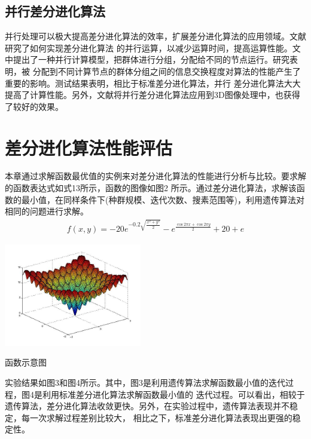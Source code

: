 \documentclass[a4paper,11pt,onecolumn,twoside]{article}
\makeatletter
\newenvironment{figurehere}
  {\def\@captype{figure}}
  {}
\makeatother
\begin{document}
\begin{CJK*}{GBK}{song}
\begin{multicols}{2}
\subsection{并行差分进化算法}
\indent 并行处理可以极大提高差分进化算法的效率，扩展差分进化算法的应用领域。文献\supercite{7}研究了如何实现差分进化算法
的并行运算，以减少运算时间，提高运算性能。文中提出了一种并行计算模型，把群体进行分组，分配给不同的节点运行。研究表明，被
分配到不同计算节点的群体分组之间的信息交换程度对算法的性能产生了重要的影响。测试结果表明，相比于标准差分进化算法，并行
差分进化算法大大提高了计算性能。另外，文献\supercite{8}将并行差分进化算法应用到3D图像处理中，也获得了较好的效果。

\section{差分进化算法性能评估}
\indent 本章通过求解函数最优值的实例来对差分进化算法的性能进行分析与比较。要求解的函数表达式如式13所示，函数的图像如图2
所示。通过差分进化算法，求解该函数的最小值，在同样条件下(种群规模、迭代次数、搜素范围等)，利用遗传算法对相同的问题进行求解。
	\begin{equation}
		\begin{split}
			f(x,y)=-20e^{-0.2\sqrt{\frac{x^2+y^2}{2}}}-e^{\frac{\cos2\pi x+\cos2\pi y}{2}}+20+e
		\end{split}
	\end{equation}
	
	\begin{figurehere}
		\centering
		\includegraphics[width=6cm]{images/function.png}
		\caption{函数示意图}\label{fig2}
	\end{figurehere}
实验结果如图3和图4所示。其中，图3是利用遗传算法求解函数最小值的迭代过程，图4是利用标准差分进化算法求解函数最小值的
迭代过程。可以看出，相较于遗传算法，差分进化算法收敛更快。另外，在实验过程中，遗传算法表现并不稳定，每一次求解过程差别比较大，
相比之下，标准差分进化算法表现出更强的稳定性。



\end{multicols}
\end{CJK*}
\end{document}
